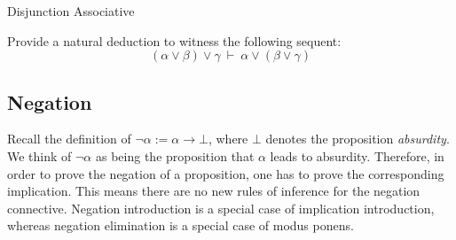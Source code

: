 \documentclass{book}
\begin{document}
    \begin{eg}{Disjunction Associative}

        Provide a natural deduction to witness the following sequent: $$(\alpha \lor \beta) \lor \gamma \ \vdash \ \alpha \lor (\beta \lor \gamma) $$

        
    \end{eg}

    \newpage
    \subsection*{Negation}

    Recall the definition of $\lnot \alpha := \alpha \to \bot$, where $\bot$ denotes the proposition \emph{absurdity}. We think of $\lnot \alpha$ as being the proposition that $\alpha$ leads to absurdity. Therefore, in order to prove the negation of a proposition, one has to prove the corresponding implication. This means there are no new rules of inference for the negation connective. Negation introduction is a special case of implication introduction, whereas negation elimination is a special case of modus ponens. 
\end{document}
